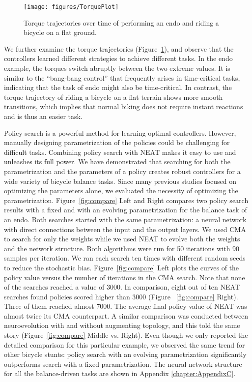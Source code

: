 \begin{figure}[ht]
  \centering
  \texttt{[image: figures/TorquePlot]}
  \caption{Torque trajectories over time of performing an endo and riding a bicycle on a flat ground. }
  \label{fig:torquePlot}
\end{figure}

We further examine the torque trajectories (Figure~\ref{fig:torquePlot}), and observe that the controllers learned different strategies to achieve different tasks. In the endo example, the torques switch abruptly between the two extreme values. It is similar to the ``bang-bang control'' that frequently arises in time-critical tasks, indicating that the task of endo might also be time-critical. In contrast, the torque trajectory of riding a bicycle on a flat terrain shows more smooth transitions, which implies that normal biking does not require instant reactions and is thus an easier task.

Policy search is a powerful method for learning optimal controllers. However, manually designing parametrization of the policies could be challenging for difficult tasks. Combining policy search with NEAT makes it easy to use and unleashes its full power. We have demonstrated that searching for both the parametrization and the parameters of a policy creates robust controllers for a wide variety of bicycle balance tasks. Since many previous studies focused on optimizing the parameters alone, we evaluated the necessity of optimizing the parametrization. Figure~\ref{fig:compare} Left and Right compares two policy search results with a fixed and with an evolving parametrization for the balance task of an endo. Both searches started with the same parametrization: a neural network with direct connections between the input and the output layers. We used CMA to search for only the weights while we used NEAT to evolve both the weights and the network structure. Both algorithms were run for 50 iterations with 90 samples per iteration. We ran each search ten times with different random seeds to reduce the stochastic bias. Figure~\ref{fig:compare} Left plots the curves of the policy value versus the number of iterations in the CMA search. Note that none of the searches reached a value of 3000. In comparison, eight out of ten NEAT searches found policies scored higher than 3000 (Figure ~\ref{fig:compare} Right). Three of them reached almost 7000. The average final policy value of NEAT was almost twice its CMA counterpart. A similar comparison was conducted between neuroevolution with and without augmenting topology, and this told the same story (Figure~\ref{fig:compare} Middle vs. Right). Even though we only reported the detailed comparison for this particular example, we observed the same trend for other bicycle stunts: policy search with an evolving parametrization significantly outperforms search with a fixed parametrization. The neural network structure for all the balance-driven tasks are shown in Appendix \ref{chapter:AppendixC}.

